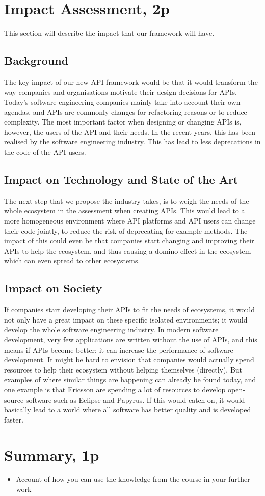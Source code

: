 \documentclass{article}
\begin{document}
\section{Impact Assessment, 2p}
This section will describe the impact that our framework will have. 

\subsection{Background}
The key impact of our new API framework would be that it would transform the way companies and organisations motivate their design decisions for APIs. Today's software engineering companies mainly take into account their own agendas, and APIs are commonly changes for refactoring reasons or to reduce complexity. The most important factor when designing or changing APIs is, however, the users of the API and their needs. In the recent years, this has been realised by the software engineering industry. This has lead to less deprecations in the code of the API users. 

\subsection{Impact on Technology and State of the Art}
The next step that we propose the industry takes, is to weigh the needs of the whole ecosystem in the assessment when creating APIs. This would lead to a more homogeneous environment where API platforms and API users can change their code jointly, to reduce the risk of deprecating for example methods. The impact of this could even be that companies start changing and improving their APIs to help the ecosystem, and thus causing a domino effect in the ecosystem which can even spread to other ecosystems. 

\subsection{Impact on Society}
If companies start developing their APIs to fit the needs of ecosystems, it would not only have a great impact on these specific isolated environments; it would develop the whole software engineering industry. In modern software development, very few applications are written without the use of APIs, and this means if APIs become better; it can increase the performance of software development. It might be hard to envision that companies would actually spend resources to help their ecosystem without helping themselves (directly). But examples of where similar things are happening can already be found today, and one example is that Ericsson are spending a lot of resources to develop open-source software such as Eclipse and Papyrus. If this would catch on, it would basically lead to a world where all software has better quality and is developed faster. 

\section{Summary, 1p}

\begin{itemize}
	\item Account of how you can use the knowledge from the course in your further work
\end{itemize}
\end{document}
